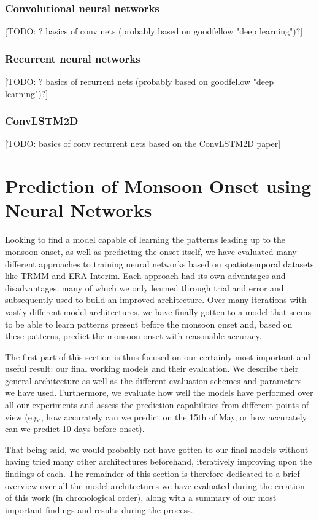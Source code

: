 \subsubsection{Convolutional neural networks}
\label{ssst:convolutional_networks}
[TODO: ? basics of conv nets (probably based on goodfellow "deep learning")?]

\subsubsection{Recurrent neural networks}
\label{ssst:recurrent_networks}
[TODO: ? basics of recurrent nets (probably based on goodfellow "deep learning")?]

\subsubsection{ConvLSTM2D}
\label{ssst:conv_lstm_2d}
[TODO: basics of conv recurrent nets based on the ConvLSTM2D paper]


\newpage
\section{Prediction of Monsoon Onset using Neural Networks}
\label{st:nn_implementation}
Looking to find a model capable of learning the patterns leading up to the monsoon onset, as well as predicting the onset itself, we have evaluated many different approaches to training neural networks based on spatiotemporal datasets like TRMM and ERA-Interim. Each approach had its own advantages and disadvantages, many of which we only learned through trial and error and subsequently used to build an improved architecture. Over many iterations with vastly different model architectures, we have finally gotten to a model that seems to be able to learn patterns present before the monsoon onset and, based on these patterns, predict the monsoon onset with reasonable accuracy.

The first part of this section is thus focused on our certainly most important and useful result: our final working models and their evaluation. We describe their general architecture as well as the different evaluation schemes and parameters we have used. Furthermore, we evaluate how well the models have performed over all our experiments and assess the prediction capabilities from different points of view (e.g., how accurately can we predict on the 15th of May, or how accurately can we predict 10 days before onset).

That being said, we would probably not have gotten to our final models without having tried many other architectures beforehand, iteratively improving upon the findings of each. The remainder of this section is therefore dedicated to a brief overview over all the model architectures we have evaluated during the creation of this work (in chronological order), along with a summary of our most important findings and results during the process.

